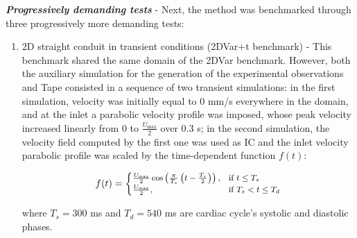 \textbf{\textit{Progressively demanding tests}} - Next, the method was benchmarked through three progressively more demanding tests:

\begin{enumerate}
    \item 2D straight conduit in transient conditions (2DVar+t benchmark) - This benchmark shared the same domain of the 2DVar benchmark. However, both the auxiliary simulation for the generation of the experimental observations and Tape consisted in a sequence of two transient simulations: in the first simulation, velocity was initially equal to 0 mm/s everywhere in the domain, and at the inlet a parabolic velocity profile was imposed, whose peak velocity increased linearly from 0 to \( \frac{ U_{\text{max}}}{2} \) over 0.3 s; in the second simulation, the velocity field computed by the first one was used as IC and the inlet velocity parabolic profile was scaled by the time-dependent function \( f(t) \):

\begin{equation}
\small
f(t) = 
\begin{cases}
\frac{U_{\text{max}}}{2}\cos\left(\frac{\pi}{T_s}\left(t - \frac{T_s}{2}\right)\right), & \text{if } t \leq T_s \\
\frac{U_{\text{max}}}{2}, & \text{if } T_s < t \leq T_d
\label{eq:12}
\end{cases}
\end{equation}

where \( T_s = 300 \) ms and \( T_d = 540 \) ms are cardiac cycle's systolic and diastolic phases. 


\end{enumerate}

